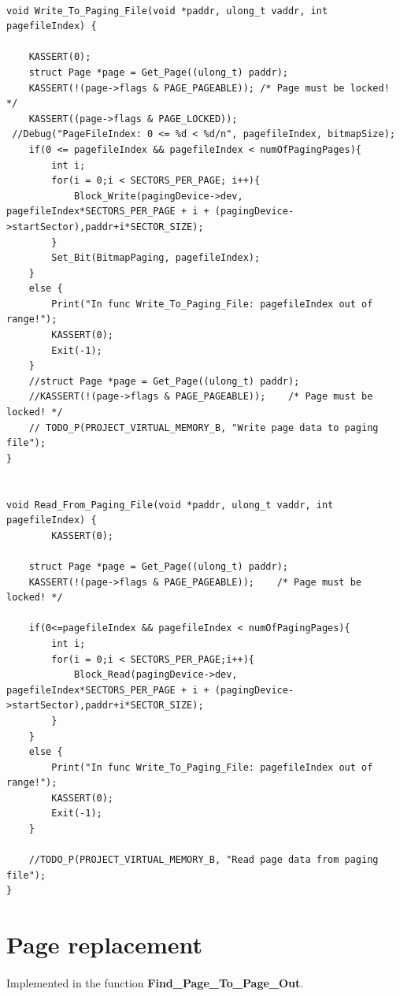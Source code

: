 \documentclass[11pt]{article}
\begin{document}
\begin{lstlisting}

void Write_To_Paging_File(void *paddr, ulong_t vaddr, int pagefileIndex) {

    KASSERT(0);
    struct Page *page = Get_Page((ulong_t) paddr);
    KASSERT(!(page->flags & PAGE_PAGEABLE)); /* Page must be locked! */
    KASSERT((page->flags & PAGE_LOCKED));
 //Debug("PageFileIndex: 0 <= %d < %d/n", pagefileIndex, bitmapSize);
    if(0 <= pagefileIndex && pagefileIndex < numOfPagingPages){
        int i;
        for(i = 0;i < SECTORS_PER_PAGE; i++){
            Block_Write(pagingDevice->dev, pagefileIndex*SECTORS_PER_PAGE + i + (pagingDevice->startSector),paddr+i*SECTOR_SIZE);      
        }
        Set_Bit(BitmapPaging, pagefileIndex); 
    }
    else {
        Print("In func Write_To_Paging_File: pagefileIndex out of range!");
        KASSERT(0);
        Exit(-1);
    }  
    //struct Page *page = Get_Page((ulong_t) paddr);
    //KASSERT(!(page->flags & PAGE_PAGEABLE));    /* Page must be locked! */
    // TODO_P(PROJECT_VIRTUAL_MEMORY_B, "Write page data to paging file");
}


void Read_From_Paging_File(void *paddr, ulong_t vaddr, int pagefileIndex) {
        KASSERT(0);

    struct Page *page = Get_Page((ulong_t) paddr);
    KASSERT(!(page->flags & PAGE_PAGEABLE));    /* Page must be locked! */

    if(0<=pagefileIndex && pagefileIndex < numOfPagingPages){
        int i;
        for(i = 0;i < SECTORS_PER_PAGE;i++){
            Block_Read(pagingDevice->dev, pagefileIndex*SECTORS_PER_PAGE + i + (pagingDevice->startSector),paddr+i*SECTOR_SIZE);      
        }
    }
    else {
        Print("In func Write_To_Paging_File: pagefileIndex out of range!");
        KASSERT(0);
        Exit(-1);
    }     

    //TODO_P(PROJECT_VIRTUAL_MEMORY_B, "Read page data from paging file");
}

\end{lstlisting}

\section{Page replacement}
\paragraph{}

Implemented in the function \textbf{Find\_Page\_To\_Page\_Out}.
\end{document}
